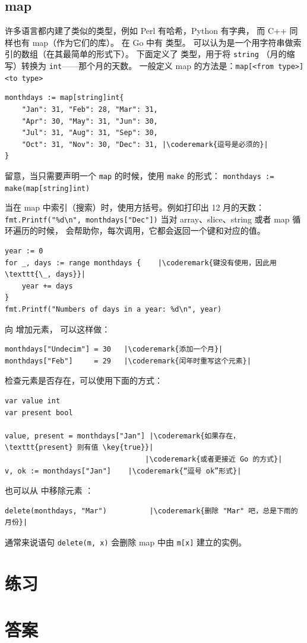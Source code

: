\subsection{map}
\label{sec:maps}
许多语言都内建了类似的类型，例如 Perl 有哈希，Python 有字典，
而 C++ 同样也有 map（作为它们的库）。 
在 Go 中有  类型。 
可以认为是一个用字符串做索引的数组（在其最简单的形式下）。
下面定义了  类型，用于将 \lstinline{string} （月的缩写）转换为 \lstinline{int}——那个月的天数。 
一般定义 map 的方法是：\verb|map[<from type>]<to type>|

\begin{lstlisting}
monthdays := map[string]int{
	"Jan": 31, "Feb": 28, "Mar": 31, 
	"Apr": 30, "May": 31, "Jun": 30, 
	"Jul": 31, "Aug": 31, "Sep": 30, 
	"Oct": 31, "Nov": 30, "Dec": 31, |\coderemark{逗号是必须的}|
}		    
\end{lstlisting}
留意，当只需要声明一个 \lstinline{map} 的时候，使用 \lstinline{make} 的形式：
\lstinline|monthdays := make(map[string]int)|

当在 map 中索引（搜索）时，使用方括号。例如打印出 12 月的天数：
\lstinline{fmt.Printf("%d\n", monthdays["Dec"])}\newline
当对 array、slice、string 或者 map 循环遍历的时候，
会帮助你，每次调用，它都会返回一个键和对应的值。
\begin{lstlisting}
year := 0
for _, days := range monthdays {    |\coderemark{键没有使用，因此用 \texttt{\_, days}}|
    year += days
}
fmt.Printf("Numbers of days in a year: %d\n", year)
\end{lstlisting}
向  增加元素， 可以这样做：
\begin{lstlisting}
monthdays["Undecim"] = 30	|\coderemark{添加一个月}|
monthdays["Feb"]     = 29	|\coderemark{闰年时重写这个元素}|
\end{lstlisting}
检查元素是否存在，可以使用下面的方式\cite{go_course_day2}：
\begin{lstlisting}
var value int
var present bool

value, present = monthdays["Jan"] |\coderemark{如果存在，\texttt{present} 则有值 \key{true}}|
                                 |\coderemark{或者更接近 Go 的方式}|
v, ok := monthdays["Jan"]	 |\coderemark{“逗号 ok”形式}|
\end{lstlisting}
也可以从  中移除元素 ：
\begin{lstlisting}
delete(monthdays, "Mar")          |\coderemark{删除 "Mar" 吧，总是下雨的月份}|
\end{lstlisting}
通常来说语句 \lstinline{delete(m, x)} 会删除 map 中由 \lstinline{m[x]} 建立的实例。

\section{练习}








\cleardoublepage
\section{答案}
\shipoutAnswer
